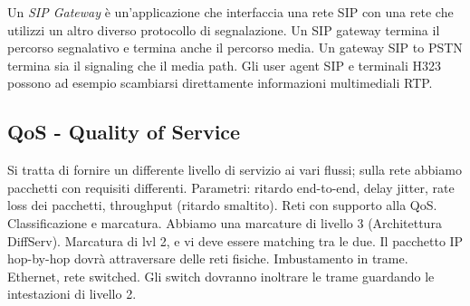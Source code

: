 \begin{itemize}
Un \textit{SIP Gateway} è un'applicazione che interfaccia una rete SIP con una rete che utilizzi un altro diverso protocollo di segnalazione. Un SIP gateway termina il percorso segnalativo e termina anche il percorso media. Un gateway SIP to PSTN termina sia il signaling che il media path. Gli user agent SIP e terminali H323 possono ad esempio scambiarsi direttamente informazioni multimediali RTP.

\end{itemize}

\subsection{QoS - Quality of Service}

Si tratta di fornire un differente livello di servizio ai vari flussi; sulla rete abbiamo pacchetti con requisiti differenti. Parametri: ritardo end-to-end, delay jitter, rate loss dei pacchetti, throughput (ritardo smaltito). Reti con supporto alla QoS. Classificazione e marcatura. Abbiamo una marcature di livello 3 (Architettura DiffServ). Marcatura di lvl 2, e vi deve essere matching tra le due. Il pacchetto IP hop-by-hop dovrà attraversare delle reti fisiche. Imbustamento in trame. Ethernet, rete switched. Gli switch dovranno inoltrare le trame guardando le intestazioni di livello 2.
